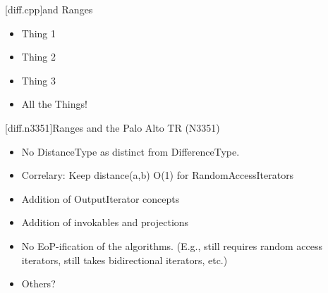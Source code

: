 
[diff.cpp]{\Cpp and Ranges}

\pnum


\begin{itemize}
\item Thing 1
\item Thing 2
\item Thing 3
\item All the Things!
\end{itemize}

[diff.n3351]{Ranges and the Palo Alto TR (N3351)}

\pnum


\begin{itemize}
\item No DistanceType as distinct from DifferenceType.
\item Correlary: Keep distance(a,b) O(1) for RandomAccessIterators
\item Addition of OutputIterator concepts
\item Addition of invokables and projections
\item No EoP-ification of the algorithms. (E.g.,  still requires random access
      iterators,  still takes bidirectional iterators, etc.)
\item Others?
\end{itemize}
